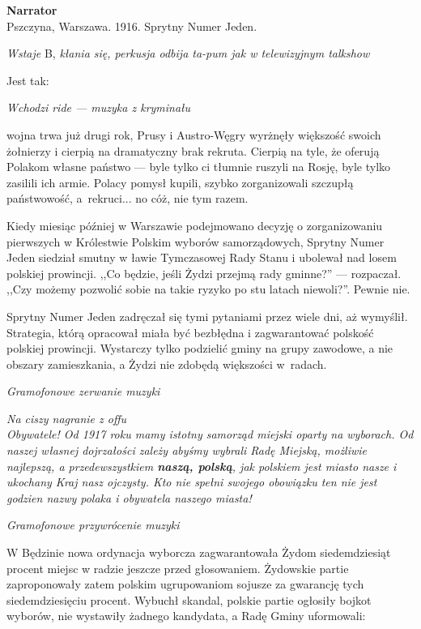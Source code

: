\documentclass[11pt,a4paper,oneside]{article}
\begin{document}
\textbf{Narrator}\\
Pszczyna, Warszawa. 1916. Sprytny Numer Jeden. 

{\color{light-gray} \emph{Wstaje} B, \emph{kłania się, perkusja odbija
ta-pum jak w telewizyjnym talkshow}}

Jest tak: 

{\color{light-gray} \emph{Wchodzi ride --- muzyka z kryminału}}

wojna trwa już drugi rok, Prusy i Austro-Węgry wyrżnęły większość
swoich żołnierzy i cierpią na dramatyczny brak rekruta. Cierpią na
tyle, że oferują Polakom własne państwo --- byle tylko ci tłumnie
ruszyli na Rosję, byle tylko zasilili ich armie. Polacy pomysł kupili,
szybko zorganizowali szczupłą państwowość, a~rekruci... no cóż, nie
tym razem.

Kiedy miesiąc później w Warszawie podejmowano decyzję o zorganizowaniu
pierwszych w Królestwie Polskim wyborów samorządowych, Sprytny Numer
Jeden siedział smutny w ławie Tymczasowej Rady Stanu i ubolewał nad
losem polskiej prowincji. ,,Co będzie, jeśli Żydzi przejmą rady
gminne?'' --- rozpaczał.  ,,Czy możemy pozwolić sobie na takie ryzyko
po stu latach niewoli?''. Pewnie nie.

Sprytny Numer Jeden zadręczał się tymi pytaniami przez wiele dni, aż
wymyślił.  Strategia, którą opracował miała być bezbłędna
i zagwarantować polskość polskiej prowincji. Wystarczy tylko podzielić
gminy na grupy zawodowe, a nie obszary zamieszkania, a Żydzi nie %
zdobędą większości w~radach.

{\color{light-gray} \emph{Gramofonowe zerwanie muzyki}}

{\color{light-gray} \emph{Na ciszy nagranie z offu}}\\
\emph{Obywatele! Od 1917 roku mamy istotny samorząd miejski oparty na
wyborach. Od naszej własnej dojrzałości zależy abyśmy wybrali Radę
Miejską, możliwie najlepszą, a przedewszystkiem \textbf{naszą,
polską}, jak polskiem jest miasto nasze i ukochany Kraj nasz ojczysty.
Kto nie spełni swojego obowiązku ten nie jest godzien nazwy polaka
i obywatela naszego miasta!}

{\color{light-gray} \emph{Gramofonowe przywrócenie muzyki}}

W Będzinie nowa ordynacja wyborcza zagwarantowała Żydom siedemdziesiąt
procent miejsc w radzie jeszcze przed głosowaniem. Żydowskie partie %
zaproponowały zatem polskim ugrupowaniom sojusze za gwarancję tych
siedemdziesięciu procent. Wybuchł skandal, polskie partie ogłosiły
bojkot wyborów, nie wystawiły żadnego kandydata, a Radę Gminy uformowali:
\end{document}
